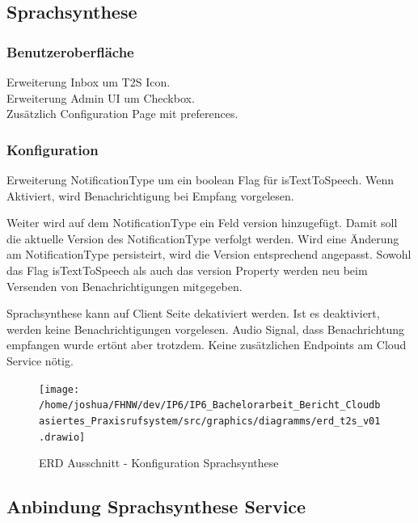 \subsection{Sprachsynthese}

\subsubsection*{Benutzeroberfläche}

Erweiterung Inbox um T2S Icon. \\
Erweiterung Admin UI um Checkbox. \\
Zusätzlich Configuration Page mit preferences. \\

\subsubsection*{Konfiguration}

Erweiterung NotificationType um ein boolean Flag für isTextToSpeech.
Wenn Aktiviert, wird Benachrichtigung bei Empfang vorgelesen.

Weiter wird auf dem NotificationType ein Feld version hinzugefügt.
Damit soll die aktuelle Version des NotificationType verfolgt werden.
Wird eine Änderung am NotificationType persisteirt, wird die Version entsprechend angepasst.
Sowohl das Flag isTextToSpeech als auch das version Property werden neu beim Versenden von Benachrichtigungen mitgegeben.

Sprachsynthese kann auf Client Seite dekativiert werden.
Ist es deaktiviert, werden keine Benachrichtigungen vorgelesen.
Audio Signal, dass Benachrichtung empfangen wurde ertönt aber trotzdem.
Keine zusätzlichen Endpoints am Cloud Service nötig. \\

\begin{figure}[h]
    \centering
    \begin{minipage}[b]{0.75\textwidth}
        \texttt{[image: /home/joshua/FHNW/dev/IP6/IP6\_Bachelorarbeit\_Bericht\_Cloudbasiertes\_Praxisrufsystem/src/graphics/diagramms/erd\_t2s\_v01.drawio]}
        \caption{ERD Ausschnitt - Konfiguration Sprachsynthese}
    \end{minipage}
\end{figure}

\clearpage

\subsection*{Anbindung Sprachsynthese Service}

